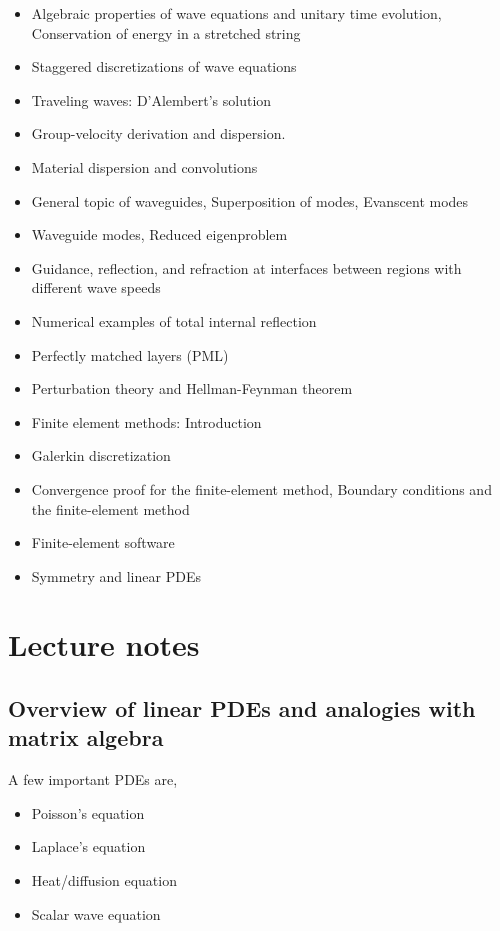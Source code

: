 \documentclass{article}
\theoremstyle{mytheoremstyle}
\theoremstyle{mytheoremstyle}
\theoremstyle{myproblemstyle}
\begin{document}
\begin{itemize}
	\item Algebraic properties of wave equations and unitary time
		evolution, Conservation of energy in a stretched string
	\item Staggered discretizations of wave equations
	\item Traveling waves: D'Alembert's solution
	\item Group-velocity derivation and dispersion.
	\item Material dispersion and convolutions
	\item General topic of waveguides, Superposition of modes,
		Evanscent modes
	\item Waveguide modes, Reduced eigenproblem
	\item Guidance, reflection, and refraction at interfaces between
		regions with different wave speeds
	\item Numerical examples of total internal reflection
	\item Perfectly matched layers (PML)
	\item Perturbation theory and Hellman-Feynman theorem
	\item Finite element methods: Introduction
	\item Galerkin discretization
	\item Convergence proof for the finite-element method, Boundary
		conditions and the finite-element method
	\item Finite-element software
	\item Symmetry and linear PDEs
    \end{itemize}

    \section{Lecture notes}
    \subsection{Overview of linear PDEs and analogies with matrix algebra}

    \noindent A few important PDEs are,
    \begin{itemize}
    	\item Poisson's equation
	\item Laplace's equation
	\item Heat/diffusion equation
	\item Scalar wave equation
    \end{itemize}
\end{document}
